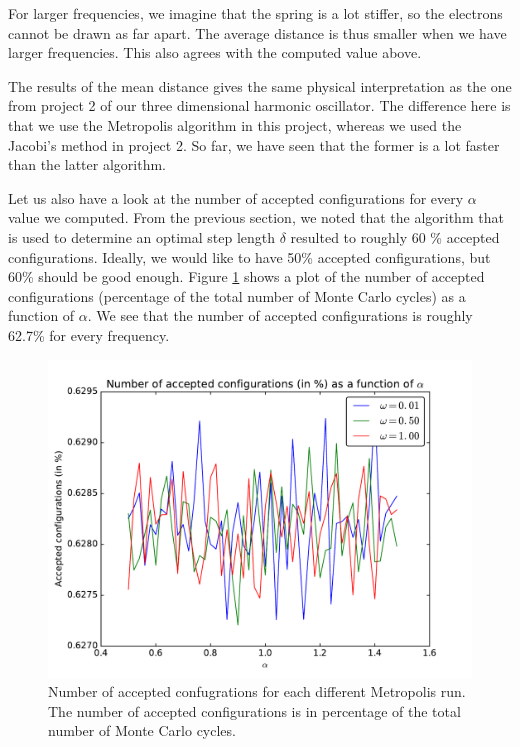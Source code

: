 \documentclass[12pt]{article}
\begin{document}
For larger frequencies, we imagine that the spring is a lot stiffer, so the electrons cannot be drawn as far apart. The average distance is thus smaller when we have larger frequencies. This also agrees with the computed value above. 

The results of the mean distance gives the same physical interpretation as the one from project 2 of our three dimensional harmonic oscillator. The difference here is that we use the Metropolis algorithm in this project, whereas we used the Jacobi's method in project 2. So far, we have seen that the former is a lot faster than the latter algorithm.

Let us also have a look at the number of accepted configurations for every $\alpha$ value we computed. From the previous section, we noted that the algorithm that is used to determine an optimal step length $\delta$ resulted to roughly 60 \% accepted configurations. Ideally, we would like to have 50\% accepted configurations, but 60\% should be good enough. Figure \ref{fig:AcceptedConfigs} shows a plot of the number of accepted configurations (percentage of the total number of Monte Carlo cycles) as a function of $\alpha$. We see that the number of accepted configurations is roughly 62.7\%  for every frequency.

\begin{figure}[h]
\centering
\includegraphics[width=\linewidth]{Plots/AcceptedConfigs.pdf}
\caption{Number of accepted confugrations for each different Metropolis run. The number of accepted configurations is in percentage of the total number of Monte Carlo cycles.}
\label{fig:AcceptedConfigs}
\end{figure}
\end{document}
